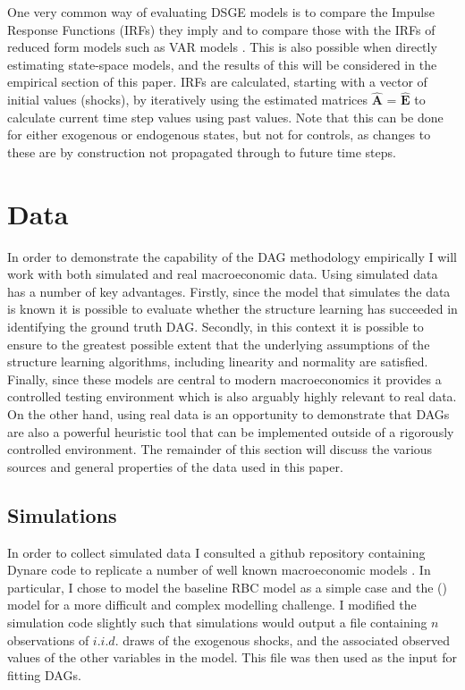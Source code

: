 \documentclass{article}
\begin{document}
One very common way of evaluating DSGE models is to compare the Impulse Response Functions (IRFs) they imply and to compare those with the IRFs of reduced form models such as VAR models \parencite[p.83]{ramey2016handbook}. This is also possible when directly estimating state-space models, and the results of this will be considered in the empirical section of this paper. IRFs are calculated, starting with a vector of initial values (shocks), by iteratively using the estimated matrices $\hat{\mathbf{A}}$ = $\hat{\mathbf{E}}$ to calculate current time step values using past values. Note that this can be done for either exogenous or endogenous states, but not for controls, as changes to these are by construction not propagated through to future time steps.

\section{Data}

In order to demonstrate the capability of the DAG methodology empirically I will work with both simulated and real macroeconomic data. Using simulated data has a number of key advantages. Firstly, since the model that simulates the data is known it is possible to evaluate whether the structure learning has succeeded in identifying the ground truth DAG. Secondly, in this context it is possible to ensure to the greatest possible extent that the underlying assumptions of the structure learning algorithms, including linearity and normality are satisfied. Finally, since these models are central to modern macroeconomics it provides a controlled testing environment which is also arguably highly relevant to real data. On the other hand, using real data is an opportunity to demonstrate that DAGs are also a powerful heuristic tool that can be implemented outside of a rigorously controlled environment. The remainder of this section will discuss the various sources and general properties of the data used in this paper.

\subsection{Simulations}

In order to collect simulated data I consulted a github repository containing Dynare code to replicate a number of well known macroeconomic models \parencite{pfeifer2020}. In particular, I chose to model the baseline RBC model as a simple case and the \citeauthor{smets2007shocks} (\citeyear{smets2007shocks}) model for a more difficult and complex modelling challenge. I modified the simulation code slightly such that simulations would output a file containing $n$ observations of $i.i.d.$ draws of the exogenous shocks, and the associated observed values of the other variables in the model. This file was then used as the input for fitting DAGs.
\end{document}
